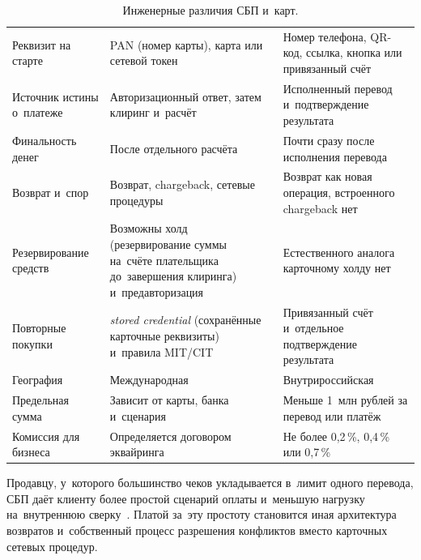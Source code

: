 \begin{table}[tbp]
  \caption{Инженерные различия СБП и~карт.}\label{tab:sbp-card-differences}
  \begingroup
  \tablesetup
  \begin{tabularx}{\textwidth}{
      @{}P{0.28\textwidth}
      Y
      Y@{}
    }
    \toprule
    \headrow
     &  &
     \\
    \midrule
    Реквизит на старте & PAN (номер карты), карта или сетевой токен &
    Номер телефона, QR-код, ссылка, кнопка или привязанный счёт \\
    \rowsep
    Источник истины о~платеже & Авторизационный ответ, затем
    клиринг и~расчёт &
    Исполненный перевод и~подтверждение результата \\
    \rowsep
    Финальность денег & После отдельного расчёта &
    Почти сразу после исполнения перевода \\
    \rowsep
    Возврат и~спор & Возврат, chargeback, сетевые процедуры &
    Возврат как новая операция, встроенного chargeback нет \\
    \rowsep
    Резервирование средств & Возможны холд (резервирование суммы на~счёте
    плательщика до~завершения клиринга) и~предавторизация &
    Естественного аналога карточному холду нет \\
    \rowsep
    Повторные покупки & \textit{stored credential} (сохранённые
    карточные реквизиты) и~правила MIT/CIT &
    Привязанный счёт и~отдельное подтверждение результата \\
    \rowsep
    География & Международная &
    Внутрироссийская \\
    \rowsep
    Предельная сумма & Зависит от карты, банка и~сценария &
    Меньше 1~млн рублей за перевод или платёж \\
    \rowsep
    Комиссия для бизнеса & Определяется договором эквайринга & Не
    более 0,2\,\%, 0,4\,\% или 0,7\,\% \\
    \bottomrule
  \end{tabularx}\par
  \endgroup
\end{table}

Продавцу, у~которого большинство чеков укладывается в~лимит одного перевода, СБП
даёт клиенту более простой сценарий оплаты и~меньшую нагрузку на~внутреннюю
сверку~\cite{sbp-faq-transfers,cbr-sbp-c2b-tariffs}. Платой за~эту простоту
становится иная архитектура возвратов и~собственный процесс разрешения
конфликтов вместо карточных сетевых процедур.

